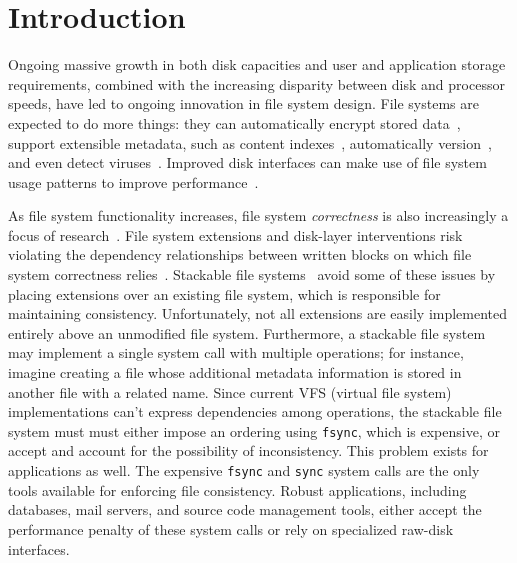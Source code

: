 
\section {Introduction}
\label{sec:intro}


Ongoing massive growth in both disk capacities and user and application
 storage requirements, combined with the increasing
 disparity between disk and processor speeds, have led to ongoing
 innovation in file system design.
%
File systems are expected to do more things: they can automatically encrypt
 stored data~\cite{wright03ncryptfs}, support extensible metadata, such as
 content indexes~\cite{jouvelot91semantic}, automatically
 version~\cite{soules03metadata,fast04versionfs,quinlan02venti,cornell04wayback},
 and even detect viruses~\cite{miretskiy04avfs}.
%
Improved disk interfaces can make use of file system usage patterns to
 improve
 performance~\cite{sivathanu03semantically-smart,sivathanu05database-aware}.



As file system functionality increases, file system \emph{correctness} is
 also increasingly a focus of
 research~\cite{sivathanuetal05-logic,denehyetal05-journal-guided}.
%
File system extensions and disk-layer interventions risk violating
 the dependency relationships between written blocks on which file system
 correctness relies~\cite{ganger00soft}.
%
Stackable file
 systems~\cite{zadok00fist,zadok99extending,heidemann94filesystem,rosenthal90evolving}
 avoid some of these issues by placing extensions over an existing
 file system, which is responsible for maintaining consistency.
%
Unfortunately, not all extensions are easily implemented entirely above an
 unmodified file system.
%
Furthermore, a stackable file system may implement a single system call
 with multiple operations; for instance, imagine creating a file whose
 additional metadata information is stored in another file with a related
 name.
%
Since current VFS (virtual file system) implementations can't
 express dependencies among operations, the stackable
 file system must must either impose an ordering using \texttt{fsync},
 which is expensive, or accept and account for the possibility of
 inconsistency.
%
This problem exists for applications as well.
%
The expensive \texttt{fsync} and \texttt{sync} system calls are the only
 tools available for enforcing file consistency.
%
Robust applications, including databases, mail servers, and source code
 management tools, either accept the performance penalty of these system
 calls or rely on specialized raw-disk interfaces.



